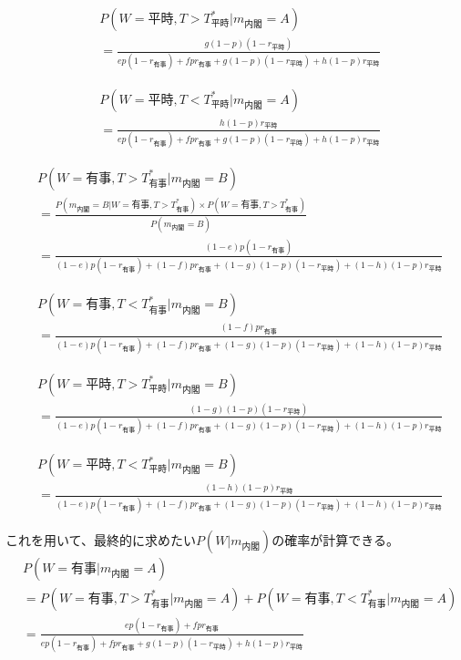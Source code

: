 \documentclass[main.tex]{subfiles}
\begin{document}
\begin{align*}
    & P(W=平時, T>T^*_{平時} | m_{内閣}=A)\\[0.5em]
    &= \frac{ g(1-p)(1-r_{平時}) }{ ep(1-r_{有事}) + fpr_{有事} + g(1-p)(1-r_{平時}) + h(1-p)r_{平時} }
\end{align*}

\begin{align*}
    & P(W=平時, T<T^*_{平時} | m_{内閣}=A)\\[0.5em]
    &= \frac{ h(1-p)r_{平時} }{ ep(1-r_{有事}) + fpr_{有事} + g(1-p)(1-r_{平時}) + h(1-p)r_{平時} }
\end{align*}



\begin{align*}
    & P(W=有事, T>T^*_{有事} | m_{内閣}=B)\\[0.5em]
    &= \frac{ P(m_{内閣}=B| W={有事}, T>T^*_{有事}) × P(W={有事}, T>T^*_{有事}) }{ P(m_{内閣}=B) } \\[1em]
    &= \frac{ (1-e)p(1-r_{有事}) }{ (1-e)p(1-r_{有事}) + (1-f)pr_{有事} + (1-g)(1-p)(1-r_{平時}) + (1-h)(1-p)r_{平時} }
\end{align*}

\begin{align*}
    & P(W=有事, T<T^*_{有事} | m_{内閣}=B)\\[0.5em]
    &= \frac{ (1-f)pr_{有事} }{ (1-e)p(1-r_{有事}) + (1-f)pr_{有事} + (1-g)(1-p)(1-r_{平時}) + (1-h)(1-p)r_{平時} }
\end{align*}

\begin{align*}
    & P(W=平時, T>T^*_{平時} | m_{内閣}=B)\\[0.5em]
    &= \frac{ (1-g)(1-p)(1-r_{平時}) }{ (1-e)p(1-r_{有事}) + (1-f)pr_{有事} + (1-g)(1-p)(1-r_{平時}) + (1-h)(1-p)r_{平時} }
\end{align*}

\begin{align*}
    & P(W=平時, T<T^*_{平時} | m_{内閣}=B)\\[0.5em]
    &= \frac{ (1-h)(1-p)r_{平時} }{ (1-e)p(1-r_{有事}) + (1-f)pr_{有事} + (1-g)(1-p)(1-r_{平時}) + (1-h)(1-p)r_{平時} }
\end{align*}


これを用いて、最終的に求めたい$P(W|m_{内閣})$の確率が計算できる。
\begin{align*}
    & P(W=有事 | m_{内閣}=A)\\[0.5em]
    &= P(W=有事, T>T^*_{有事} | m_{内閣}=A) + P(W=有事, T<T^*_{有事} | m_{内閣}=A)\\[0.5em]
    &= \frac{ ep(1-r_{有事}) +  fpr_{有事}  }{ ep(1-r_{有事}) + fpr_{有事} + g(1-p)(1-r_{平時}) + h(1-p)r_{平時} }
\end{align*}
\end{document}
